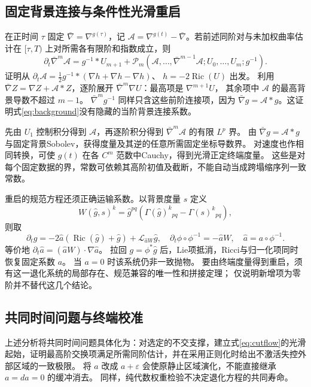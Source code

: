 \documentclass[UTF8,a4paper,11pt,fontset=fandol]{ctexart}
\numberwithin{equation}{section}
\theoremstyle{definition}
\newcommand{\Ric}{\operatorname{Ric}}
\begin{document}
\subsection{固定背景连接与条件性光滑重启}
在正时间 $\tau$ 固定 $\bar\nabla=\nabla^{g(\tau)}$，记
$\mathscr A=\nabla^{g(t)}-\bar\nabla$。若前述同阶对与未加权曲率估计在
$[\tau,T)$ 上对所需各有限阶和指数成立，则
\begin{equation}\label{eq:background}
\partial_t\bar\nabla^m\mathscr A
=g^{-1}*U_{m+1}
+\mathcal P_m(\mathscr A,\ldots,\bar\nabla^{m-1}\mathscr A;
U_0,\ldots,U_m;g^{-1}).
\end{equation}
证明从
$\partial_t\mathscr A=\tfrac12g^{-1}*(\nabla h+\nabla h-\nabla h)$、
$h=-2\Ric(U)$ 出发。
利用 $\bar\nabla Z=\nabla Z+\mathscr A*Z$，逐阶展开
$\bar\nabla^m\nabla U$：最高项是 $\nabla^{m+1}U$，
其余项中 $\mathscr A$ 的最高背景导数不超过 $m-1$。
$\bar\nabla^mg^{-1}$ 同样只含这些前阶连接项，因为
$\bar\nabla g=\mathscr A*g$。这证明式\eqref{eq:background}没有隐藏的当阶背景连接系数。

先由 $U_1$ 控制积分得到 $\mathscr A$，再逐阶积分得到
$\bar\nabla^m\mathscr A$ 的有限 $L^p$ 界。
由 $\bar\nabla g=\mathscr A*g$ 与固定背景Sobolev，获得度量及其逆的任意所需固定坐标导数界。
对速度也作相同转换，可使 $g(t)$ 在各 $C^m$ 范数中Cauchy，得到光滑正定终端度量。
这些是对每个固定数据的界，常数可依赖其高阶初值及截断，不能自动当成跨塌缩序列一致常数。

重启的规范方程还须正确运输系数。以背景度量 $s$ 定义
\[
W(\widehat g,s)^k=\widehat g^{pq}
(\Gamma(\widehat g)^k{}_{pq}-\Gamma(s)^k{}_{pq}),
\]
则取
\[
\partial_t\widehat g
=-2\widehat a(\Ric(\widehat g)+\widehat g)
+\mathcal L_{\widehat aW}\widehat g,\quad
\partial_t\phi\circ\phi^{-1}=-\widehat aW,\quad
\widehat a=a\circ\phi^{-1}.
\]
等价地 $\partial_t\widehat a=(\widehat aW)\cdot\nabla\widehat a$。
拉回 $g=\phi^*\widehat g$ 后，Lie项抵消，Ricci与归一化项同时恢复固定系数 $a$。
当 $a=0$ 时该系统仍非一致抛物。
要由终端度量得到重启，须有这一退化系统的局部存在、规范兼容的唯一性和拼接定理；
仅说明新增项为零阶并不替代这几个结论。

\subsection{共同时间问题与终端校准}
上述分析将共同时间问题具体化为：对选定的不交支撑，建立式\eqref{eq:cutflow}的光滑起始，证明最高阶交换项满足所需同阶估计，并在采用正则化时给出不激活失控外部区域的一致极限。
将 $a$ 改成 $a+\varepsilon$ 会使原静止区域演化，不能直接继承 $a=da=0$ 的缓冲消去。
同样，纯代数权重检验不决定退化方程的共同寿命。
\end{document}
